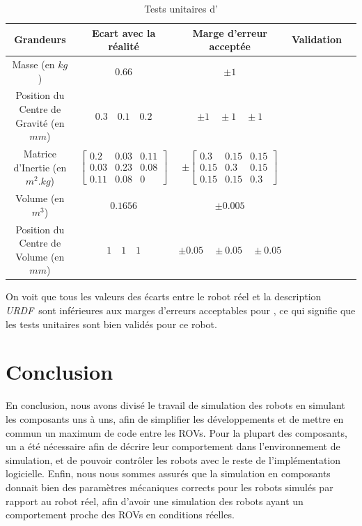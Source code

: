 			\begin{table}[!htb]
				\centering
				\begin{adjustbox}{max width=\textwidth}
					\begin{tabular}{|c|c|c|c|c|}
						\hline
						\textbf{Grandeurs} & \textbf{Ecart avec la réalité} & \textbf{Marge d'erreur acceptée} & \textbf{Validation} \\
						\hline
						Masse (en $kg$) & $0.66$ & $\pm 1$ & \cmark \\
						\hline
						Position du Centre de Gravité (en $mm$) & $0.3 \quad 0.1 \quad 0.2$ & $\pm 1 \quad \pm 1 \quad \pm 1$ & \cmark \\
						\hline
						Matrice d'Inertie (en $m^2.kg$) & $\begin{bmatrix}0.2 & 0.03 & 0.11 \\ 0.03 & 0.23 & 0.08 \\ 0.11 & 0.08 & 0\end{bmatrix}$ & $\pm \begin{bmatrix}0.3 & 0.15 & 0.15 \\ 0.15 & 0.3 & 0.15 \\ 0.15 & 0.15 & 0.3\end{bmatrix}$ & \cmark \\
						\hline
						Volume (en $m^3$) & $0.1656$ & $\pm 0.005$ & \cmark \\
						\hline
						Position du Centre de Volume (en $mm$) & $1 \quad 1 \quad 1$ & $\pm 0.05 \quad \pm 0.05 \quad \pm 0.05$ & \cmark \\
						\hline
					\end{tabular}
				\end{adjustbox}
				\caption{Tests unitaires d'\atoll{}}
				\label{table:atoll_unittest}
			\end{table}

			On voit que tous les valeurs des écarts entre le robot réel et la description \textit{URDF} sont inférieures aux marges d'erreurs acceptables pour \argos{}, ce qui signifie que les tests unitaires sont bien validés pour ce robot.

	\section{Conclusion}
	
		En conclusion, nous avons divisé le travail de simulation des robots en simulant les composants uns à uns, afin de simplifier les développements et de mettre en commun un maximum de code entre les \gls{ROV}s. Pour la plupart des composants, un \plugin{} \gazebo{} a été nécessaire afin de décrire leur comportement dans l'environnement de simulation, et de pouvoir contrôler les robots avec le reste de l'implémentation logicielle. Enfin, nous nous sommes assurés que la simulation en composants donnait bien des paramètres mécaniques corrects pour les robots simulés par rapport au robot réel, afin d'avoir une simulation des robots ayant un comportement proche des \gls{ROV}s en conditions réelles.
